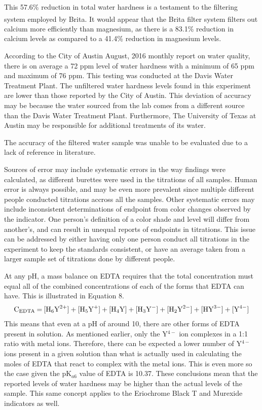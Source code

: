 \documentclass{article}
\begin{document}
This 57.6\% reduction in total water hardness is a testament to the filtering
system employed by Brita\textsuperscript{\textregistered}.
It would appear that the Brita\textsuperscript{\textregistered} filter system
filters out calcium more efficiently than magnesium, as there is a 83.1\%
reduction in calcium levels as compared to a 41.4\% reduction in magnesium
levels.

According to the City of Austin August, 2016 monthly report on water quality,
there is on average a 72 ppm level of water hardness with a minimum of 65 ppm
and maximum of 76 ppm. This testing was conducted at the Davis Water Treatment
Plant.\cite{austin} The unfiltered water hardness levels found in this
experiment are lower than those reported by the City of Austin. This deviation
of accuracy may be because the water sourced from the lab comes from a different
source than the Davis Water Treatment Plant. Furthermore, The University of
Texas at Austin may be responsible for additional treatments of its water.

The accuracy of the filtered water sample was unable to be evaluated due to a
lack of reference in literature.

Sources of error may include systematic errors in the way findings were
calculated, as different burettes were used in the titrations of all samples. 
Human error is always possible, and may be even more prevalent since multiple
different people conducted titrations accross all the samples. Other systematic
errors may include inconsistent determinations of endpoint from color changes
observed by the indicator. One person's definition of a color shade and level
will differ from another's, and can result in unequal reports of endpoints in
titrations. This issue can be addressed by either having only one person conduct
all titrations in the experiment to keep the standards consistent, or have an
average taken from a larger sample set of titrations done by different people.

At any pH, a mass balance on EDTA requires that the total concentration must
equal all of the combined concentrations of each of the forms that EDTA can
have. This is illustrated in Equation 8.
\begin{align}
        \ce {C_{EDTA} = [H6Y^{2+}] + [H5Y+] + [H4Y] + [H3Y^{-}] + [H2Y^{2-}] +
        [HY^{3-}] + [Y^{4-}]}
\end{align}
This means that even at a pH of around 10, there are other forms of EDTA present
in solution. As mentioned earlier, only the Y$^{4-}$ ion complexes in a 1:1
ratio with metal ions. Therefore, there can be expected a lower number of Y$^{4-}$
ions present in a given solution than what is actually used in calculating the
moles of EDTA that react to complex with the metal ions.\cite{chemwiki} This is even more so
the case given the pK$_{a6}$ value of EDTA is 10.37. These conclusions mean that
the reported levels of water hardness may be higher than the actual levels of
the sample.
This same concept applies to the Eriochrome Black T and Murexide indicators as
well.
\end{document}
